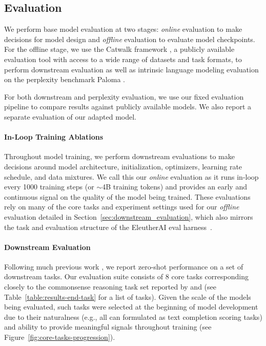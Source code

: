 \documentclass[11pt]{article}
\begin{document}
\subsection{Evaluation}
\label{sec:evaluation}
We perform base model evaluation at two stages: \emph{online} evaluation to make decisions for model design and \emph{offline} evaluation to evaluate model checkpoints. 
For the offline stage, we use the Catwalk framework \citep{groeneveld2023catwalk}, a publicly available evaluation tool with access to a wide range of datasets and task formats, 
to perform downstream evaluation as well as intrinsic language modeling evaluation on the perplexity benchmark Paloma \citep{magnusson2023paloma}.

For both downstream and perplexity evaluation, we use our fixed evaluation pipeline
to compare results against publicly available models. We also report a separate evaluation of our adapted model.  

\paragraph{In-Loop Training Ablations}
\label{sec:ablation}

Throughout model training, we perform downstream evaluations to make decisions around model architecture, initialization, optimizers, learning rate schedule, and data mixtures. We call this our \emph{online} evaluation as it runs in-loop every 1000 training steps (or $\sim$4B training tokens) and provides an early and continuous signal on the quality of the model being trained. These evaluations rely on many of the core tasks and experiment settings used for our \emph{offline} evaluation detailed in Section~\ref{sec:downstream_evaluation}, which also mirrors the task and evaluation structure of the EleutherAI eval harness~\citep{eval-harness}.

\paragraph{Downstream Evaluation}
\label{sec:evaluation-downstream}
Following much previous work \citep[][\emph{inter alia}]{Brown2020LanguageMA,gpt-neox-20b,touvron2023llama1,touvron2023llama2}, we report zero-shot performance on a set of downstream tasks. Our evaluation suite consists of 8 core tasks corresponding closely to the commonsense reasoning task set reported by \citet{touvron2023llama1} and \citet{touvron2023llama2} (see Table~\ref{table:results-end-task} for a list of tasks). Given the scale of the models being evaluated, such tasks were selected at the beginning of model development due to their naturalness (e.g., all can formulated as text completion scoring tasks) and ability to provide meaningful signals throughout training (see Figure~\ref{fig:core-tasks-progression}). 
\end{document}
